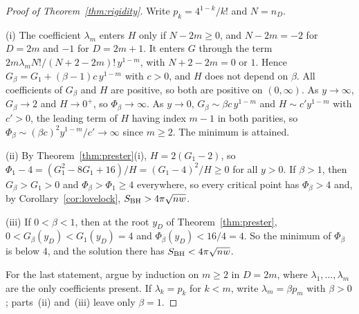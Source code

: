 \begin{proof}[Proof of Theorem~\ref{thm:rigidity}]
Write $p_k=4^{1-k}/k!$ and $N=n_D$.

(i) The coefficient $\lambda_m$ enters $H$ only if $N-2m\ge0$, and $N-2m=-2$ for $D=2m$ and $-1$ for $D=2m+1$. It enters $G$ through the term $2m\lambda_mN!/(N+2-2m)!\,y^{1-m}$, with $N+2-2m=0$ or $1$. Hence $G_\beta=G_1+(\beta-1)c\,y^{1-m}$ with $c>0$, and $H$ does not depend on $\beta$. All coefficients of $G_\beta$ and $H$ are positive, so both are positive on $(0,\infty)$. As $y\to\infty$, $G_\beta\to2$ and $H\to0^+$, so $\Phi_\beta\to\infty$. As $y\to0$, $G_\beta\sim\beta c\,y^{1-m}$ and $H\sim c'y^{1-m}$ with $c'>0$, the leading term of $H$ having index $m-1$ in both parities, so $\Phi_\beta\sim(\beta c)^2y^{1-m}/c'\to\infty$ since $m\ge2$. The minimum is attained.

(ii) By Theorem~\ref{thm:prester}(i), $H=2(G_1-2)$, so $\Phi_1-4=(G_1^2-8G_1+16)/H=(G_1-4)^2/H\ge0$ for all $y>0$. If $\beta>1$, then $G_\beta>G_1>0$ and $\Phi_\beta>\Phi_1\ge4$ everywhere, so every critical point has $\Phi_\beta>4$ and, by Corollary~\ref{cor:lovelock}, $S_{\rm BH}>4\pi\sqrt{nw}$.

(iii) If $0<\beta<1$, then at the root $y_D$ of Theorem~\ref{thm:prester}, $0<G_\beta(y_D)<G_1(y_D)=4$ and $\Phi_\beta(y_D)<16/4=4$. So the minimum of $\Phi_\beta$ is below $4$, and the solution there has $S_{\rm BH}<4\pi\sqrt{nw}$.

For the last statement, argue by induction on $m\ge2$ in $D=2m$, where $\lambda_1,\dots,\lambda_m$ are the only coefficients present. If $\lambda_k=p_k$ for $k<m$, write $\lambda_m=\beta p_m$ with $\beta>0$; parts~(ii) and~(iii) leave only $\beta=1$.
\end{proof}
